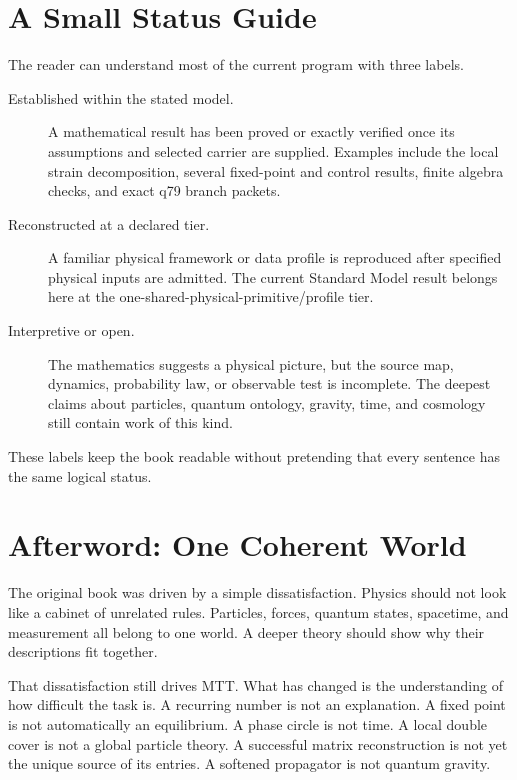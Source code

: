 \documentclass[11pt,openany]{book}
\begin{document}
\chapter{A Small Status Guide}

The reader can understand most of the current program with three labels.

\begin{description}
\item[Established within the stated model.] A mathematical result has been
proved or exactly verified once its assumptions and selected carrier are
supplied. Examples include the local strain decomposition, several
fixed-point and control results, finite algebra checks, and exact q79 branch
packets.

\item[Reconstructed at a declared tier.] A familiar physical framework or
data profile is reproduced after specified physical inputs are admitted. The
current Standard Model result belongs here at the
one-shared-physical-primitive/profile tier.

\item[Interpretive or open.] The mathematics suggests a physical picture, but
the source map, dynamics, probability law, or observable test is incomplete.
The deepest claims about particles, quantum ontology, gravity, time, and
cosmology still contain work of this kind.
\end{description}

These labels keep the book readable without pretending that every sentence
has the same logical status.

\chapter{Afterword: One Coherent World}

The original book was driven by a simple dissatisfaction. Physics should not
look like a cabinet of unrelated rules. Particles, forces, quantum states,
spacetime, and measurement all belong to one world. A deeper theory should
show why their descriptions fit together.

That dissatisfaction still drives MTT. What has changed is the understanding
of how difficult the task is. A recurring number is not an explanation. A
fixed point is not automatically an equilibrium. A phase circle is not time.
A local double cover is not a global particle theory. A successful matrix
reconstruction is not yet the unique source of its entries. A softened
propagator is not quantum gravity.
\end{document}
